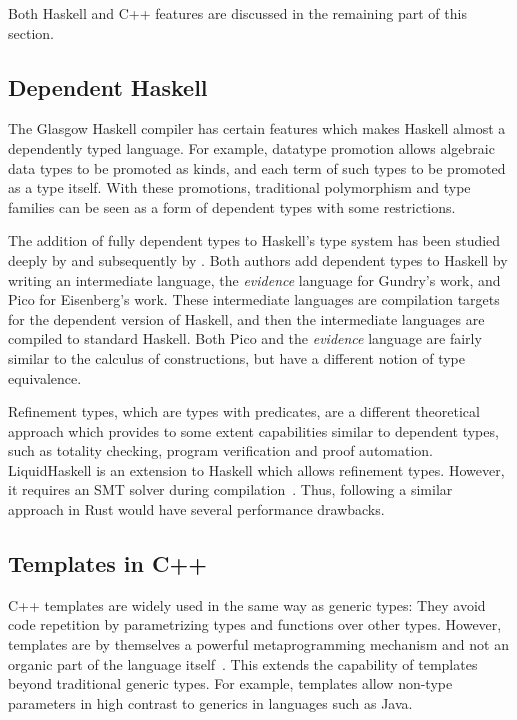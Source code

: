 Both Haskell and C++ features are discussed in the remaining part of this
section.

\subsection{Dependent Haskell} 

The Glasgow Haskell compiler has certain features which makes Haskell almost a
dependently typed language. For example, datatype promotion allows algebraic
data types to be promoted as kinds, and each term of such types to be promoted
as a type itself. With these promotions, traditional polymorphism and type
families can be seen as a form of dependent types with some restrictions.

The addition of fully dependent types to Haskell's type system has been studied
deeply by \citet{gundry} and subsequently by \citet{eisenberg}. Both authors
add dependent types to Haskell by writing an intermediate language, the
\textit{evidence} language for Gundry's work, and Pico for Eisenberg's work.
These intermediate languages are compilation targets for the dependent version
of Haskell, and then the intermediate languages are compiled to standard
Haskell. Both Pico and the \textit{evidence} language are fairly similar to the
calculus of constructions, but have a different notion of type equivalence.

Refinement types, which are types with predicates, are a different theoretical
approach which provides to some extent capabilities similar to dependent types,
such as totality checking, program verification and proof automation.
LiquidHaskell is an extension to Haskell which allows refinement types. However,
it requires an SMT solver during compilation~\cite{liquidhaskell}. Thus,
following a similar approach in Rust would have several performance drawbacks.

\subsection{Templates in C++} 

C++ templates are widely used in the same way as generic types: They avoid code
repetition by parametrizing types and functions over other types. However,
templates are by themselves a powerful metaprogramming mechanism and not an
organic part of the language itself~\cite{template_metaprogramming}. This
extends the capability of templates beyond traditional generic types. For
example, templates allow non-type parameters in high contrast to generics in
languages such as Java.

